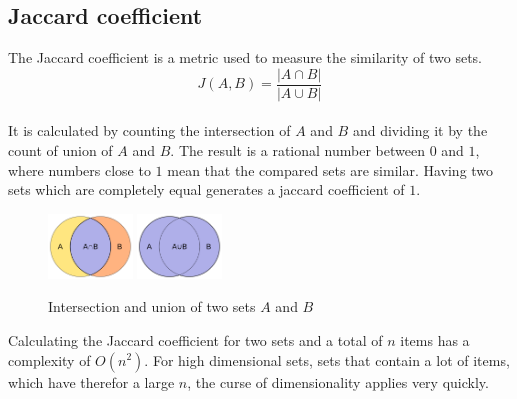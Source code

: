 \subsection{Jaccard coefficient}

The Jaccard coefficient is a metric used to measure the similarity of two sets.\\

\begin{equation}
    J(A,B) = \frac{ | A \cap B | }{ | A \cup B | }
\end{equation}\\

It is calculated by counting the intersection of $ A $ and $ B $ and dividing it by the count of union of $ A $ and $ B $. The result is a rational number between $ 0 $ and $ 1 $, where numbers close to $ 1 $ mean that the compared sets are similar. Having two sets which are completely equal generates a jaccard coefficient of $ 1 $.\\

\begin{figure}[H]
    \centering
    \includegraphics[width=0.20\textwidth]{images/Intersection_of_sets_A_and_B.png} 
    \includegraphics[width=0.20\textwidth]{images/Union_of_sets_A_and_B.png}
    \caption{Intersection and union of two sets $ A $ and $ B $ \cite{intersectionImage,unionImage}}
\end{figure}

Calculating the Jaccard coefficient for two sets and a total of $ n $ items has a complexity of $ O(n^2) $. For high dimensional sets, sets that contain a lot of items, which have therefor a large $ n $, the curse of dimensionality applies very quickly.\\
